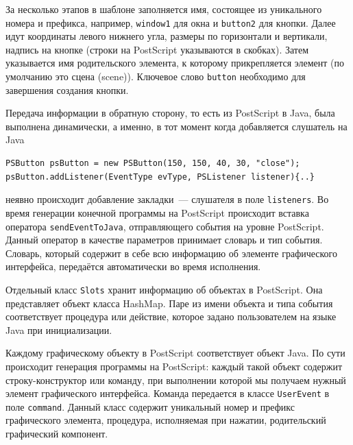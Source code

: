 За несколько этапов в шаблоне заполняется имя, состоящее из уникального номера и префикса, например, \texttt{window1} для окна и \texttt{button2} для кнопки. Далее идут координаты левого нижнего угла, размеры по горизонтали и вертикали, надпись на кнопке (строки на PostScript указываются в скобках). Затем указывается имя родительского элемента, к которому прикрепляется элемент (по умолчанию это сцена (scene)). Ключевое слово \texttt{button} необходимо для завершения создания кнопки.

Передача информации в обратную сторону, то есть из PostScript в Java, была выполнена динамически, а именно, в тот момент когда добавляется слушатель на Java 


\lstset{language=Java,basicstyle=\footnotesize\ttfamily} 
\begin{lstlisting}
PSButton psButton = new PSButton(150, 150, 40, 30, "close");
psButton.addListener(EventType evType, PSListener listener){..}
\end{lstlisting}

\noindent неявно происходит добавление закладки~--- слушателя в поле \texttt{listeners}. Во время генерации конечной программы на PostScript происходит вставка оператора \texttt{sendEventToJava}, отправляющего события на уровне PostScript. Данный оператор в качестве параметров принимает словарь и тип события. Словарь, который содержит в себе всю информацию об элементе графического интерфейса, передаётся автоматически во время исполнения.

Отдельный класс \texttt{Slots} хранит информацию об объектах в PostScript. Она представляет объект класса HashMap. Паре из имени объекта и типа события соответствует процедура или действие, которое задано пользователем на языке Java при инициализации. 


Каждому графическому объекту в PostScript соответствует объект Java. По сути происходит генерация программы на PostScript: каждый такой объект содержит строку-конструктор или команду, при выполнении которой мы получаем нужный элемент графического интерфейса. Команда передается в классе \texttt{UserEvent} в поле \texttt{command}. Данный класс содержит уникальный номер и префикс графического элемента, процедура, исполняемая при нажатии, родительский графический компонент.


